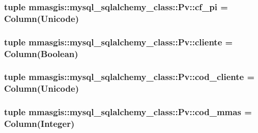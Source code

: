 \label{classmmasgis_1_1mysql__sqlalchemy__class_1_1Pv_abf5e2f2735931b010673d4d24cbc2d62}
\hypertarget{classmmasgis_1_1mysql__sqlalchemy__class_1_1Pv_aa2f3ca9873cfa4c5e57ef4ebc0392f85}{
\subsubsection[{cf\_\-pi}]{\setlength{\rightskip}{0pt plus 5cm}tuple {\bf mmasgis::mysql\_\-sqlalchemy\_\-class::Pv::cf\_\-pi} = Column(Unicode)}}
\label{classmmasgis_1_1mysql__sqlalchemy__class_1_1Pv_aa2f3ca9873cfa4c5e57ef4ebc0392f85}
\hypertarget{classmmasgis_1_1mysql__sqlalchemy__class_1_1Pv_aebd97397202c1b2bbadc4ac3849dec5e}{
\subsubsection[{cliente}]{\setlength{\rightskip}{0pt plus 5cm}tuple {\bf mmasgis::mysql\_\-sqlalchemy\_\-class::Pv::cliente} = Column(Boolean)}}
\label{classmmasgis_1_1mysql__sqlalchemy__class_1_1Pv_aebd97397202c1b2bbadc4ac3849dec5e}
\hypertarget{classmmasgis_1_1mysql__sqlalchemy__class_1_1Pv_a1f08533b7746a74107f5b45d5458d330}{
\subsubsection[{cod\_\-cliente}]{\setlength{\rightskip}{0pt plus 5cm}tuple {\bf mmasgis::mysql\_\-sqlalchemy\_\-class::Pv::cod\_\-cliente} = Column(Unicode)}}
\label{classmmasgis_1_1mysql__sqlalchemy__class_1_1Pv_a1f08533b7746a74107f5b45d5458d330}
\hypertarget{classmmasgis_1_1mysql__sqlalchemy__class_1_1Pv_a5dad0fb51aea5c29768eefd7e260f602}{
\subsubsection[{cod\_\-mmas}]{\setlength{\rightskip}{0pt plus 5cm}tuple {\bf mmasgis::mysql\_\-sqlalchemy\_\-class::Pv::cod\_\-mmas} = Column(Integer)}}

